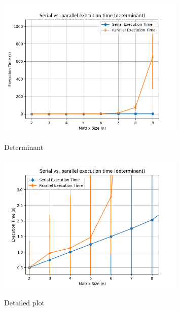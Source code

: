 \begin{figure}[H]
    \includegraphics[width=0.8\textwidth, keepaspectratio]{../img/det_2_10_3.png}
    \centering
    \label{fig:det}
    \caption{Determinant}

    \includegraphics[width=0.8\textwidth, keepaspectratio]{../img/det_2_10_3_detail.png}
    \centering
    \label{fig:det_detail}
    \caption{Detailed plot}
\end{figure}   


